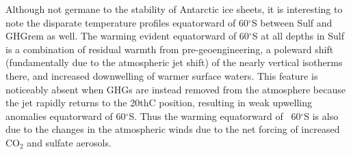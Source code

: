 \documentclass{nature}
\begin{document}
Although not germane to the stability of Antarctic ice sheets, it is interesting to note the disparate temperature profiles equatorward of 60$^\circ$S between Sulf and GHGrem as well. The warming evident equatorward of 60$^\circ$S at all depths in Sulf is a combination of residual warmth from pre-geoengineering, a poleward shift (fundamentally due to the atmospheric jet shift) of the nearly vertical isotherms there, and increased downwelling of warmer surface waters. This feature is noticeably absent when GHGs are instead removed from the atmosphere because the jet rapidly returns to the 20thC position, resulting in weak upwelling anomalies equatorward of 60$^\circ$S. Thus the warming equatorward of ~60$^\circ$S is also due to the changes in the atmospheric winds due to the net forcing of increased CO$_2$ and sulfate aerosols.%
\end{document}
